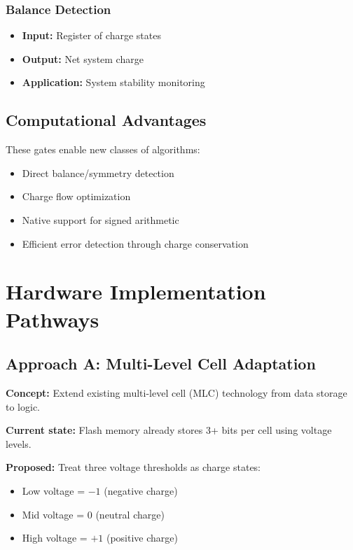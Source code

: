 \documentclass[11pt,a4paper]{article}
\begin{document}
\subsubsection{Balance Detection}
\begin{itemize}
\item \textbf{Input:} Register of charge states
\item \textbf{Output:} Net system charge
\item \textbf{Application:} System stability monitoring
\end{itemize}

\subsection{Computational Advantages}

These gates enable new classes of algorithms:
\begin{itemize}
\item Direct balance/symmetry detection
\item Charge flow optimization
\item Native support for signed arithmetic
\item Efficient error detection through charge conservation
\end{itemize}

\section{Hardware Implementation Pathways}

\subsection{Approach A: Multi-Level Cell Adaptation}

\textbf{Concept:} Extend existing multi-level cell (MLC) technology from data storage to logic.

\textbf{Current state:} Flash memory already stores 3+ bits per cell using voltage levels.

\textbf{Proposed:} Treat three voltage thresholds as charge states:
\begin{itemize}
\item Low voltage = $-1$ (negative charge)
\item Mid voltage = $0$ (neutral charge)
\item High voltage = $+1$ (positive charge)
\end{itemize}
\end{document}
